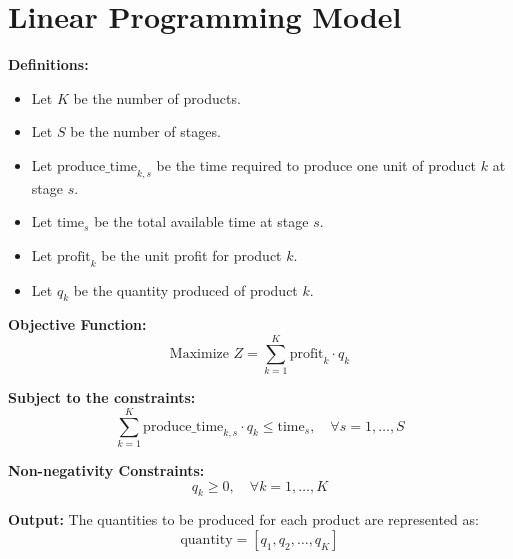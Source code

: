 \documentclass{article}
\begin{document}
\section*{Linear Programming Model}

\textbf{Definitions:}

\begin{itemize}
    \item Let \( K \) be the number of products.
    \item Let \( S \) be the number of stages.
    \item Let \( \text{produce\_time}_{k,s} \) be the time required to produce one unit of product \( k \) at stage \( s \).
    \item Let \( \text{time}_{s} \) be the total available time at stage \( s \).
    \item Let \( \text{profit}_{k} \) be the unit profit for product \( k \).
    \item Let \( q_{k} \) be the quantity produced of product \( k \).
\end{itemize}

\textbf{Objective Function:}
\[
\text{Maximize } Z = \sum_{k=1}^{K} \text{profit}_{k} \cdot q_{k}
\]

\textbf{Subject to the constraints:}
\[
\sum_{k=1}^{K} \text{produce\_time}_{k,s} \cdot q_{k} \leq \text{time}_{s}, \quad \forall s = 1,\ldots,S
\]

\textbf{Non-negativity Constraints:}
\[
q_{k} \geq 0, \quad \forall k = 1,\ldots,K
\]

\textbf{Output:}
The quantities to be produced for each product are represented as:
\[
\text{quantity} = [q_{1}, q_{2}, \ldots, q_{K}]
\]
\end{document}
